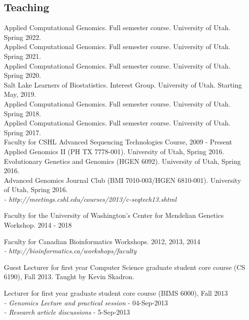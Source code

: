 \documentclass[margin,line]{cv}
\begin{document}
\begin{resume}
    \section{\mysidestyle Teaching}
    Applied Computational Genomics. Full semester course. University of Utah. Spring 2022. \\
    Applied Computational Genomics. Full semester course. University of Utah. Spring 2021. \\
    Applied Computational Genomics. Full semester course. University of Utah. Spring 2020. \\
    Salt Lake Learners of Biostatistics. Interest Group. University of Utah. Starting May, 2019. \\
    Applied Computational Genomics. Full semester course. University of Utah. Spring 2018. \\
    Applied Computational Genomics. Full semester course. University of Utah. Spring 2017. \\
    Faculty for CSHL Advanced Sequencing Technologies Course, 2009 - Present\\
    Applied Genomics II (PH TX 7778-001). University of Utah, Spring 2016. \\
    Evolutionary Genetics and Genomics (HGEN 6092). University of Utah, Spring 2016. \\
    Advanced Genomics Journal Club (BMI 7010-003/HGEN 6810-001). University of Utah, Spring 2016. \\
    \emph{- http://meetings.cshl.edu/courses/2013/c-seqtech13.shtml}

    \vspace{-2mm}
    Faculty for the University of Washington's Center for Mendelian Genetics Workshop. 2014 - 2018

    \vspace{-2mm}
    Faculty for Canadian Bioinformatics Workshops. 2012, 2013, 2014 \\
    \emph{- http://bioinformatics.ca/workshops/faculty}

    \vspace{-2mm}
    Guest Lecturer for first year Computer Science graduate student core course (CS 6190), Fall 2013. Taught by Kevin Skadron.

    \vspace{-2mm}
    Lecturer for first year graduate student core course (BIMS 6000), Fall 2013 \\
    \emph{- Genomics Lecture and practical session} - 04-Sep-2013 \\
    \emph{- Research article discussions} - 5-Sep-2013


\end{resume}
\end{document}
